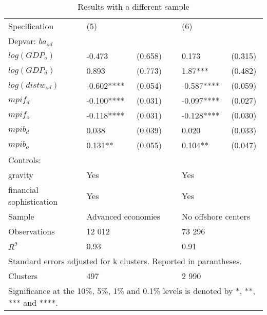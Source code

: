 \documentclass[12pt,a4paper]{article}
\begin{document}
\begin{table}[!h]
\centering
\begin{tabular}{ l l l l l l}
\hline
Specification&(5)&&&(6)& \\
Depvar: $ba_{od}$&&&&&\\
\hline
$log(GDP_{o})$&-0.473&(0.658)&&0.173&(0.315)\\
$log(GDP_{d})$&0.893&(0.773)&&1.87***&(0.482)\\
$log(distw_{od})$&-0.602****&(0.054)&&-0.587****&(0.059)\\
$mpif_{d}$&-0.100****&(0.031)&&-0.097****&(0.027)\\
$mpif_{o}$&-0.118****&(0.031)&&-0.128****&(0.030)\\
$mpib_{d}$&0.038&(0.039)&&0.020&(0.033)\\
$mpib_{o}$&0.131**&(0.055)&&0.104**&(0.047)\\
Controls:&&&&&\\
gravity &Yes&&&Yes& \\ 
financial sophistication &Yes&&&Yes& \\
\hline
Sample &\multicolumn{2}{l}{Advanced economies}&&\multicolumn{2}{l}{No offshore centers} \\
Observations &12 012&&&73 296& \\
\hline
$R^2$&0.93&&&0.91&\\
\hline
\multicolumn{6}{l}{Standard errors adjusted for k clusters. Reported in parantheses. }\\
Clusters &497&&&2 990& \\
\hline
\multicolumn{6}{l}{\footnotesize Significance at the 10\%, 5\%, 1\% and 0.1\% levels is denoted by *, **, *** and ****.}\\
\end{tabular}
\caption{Results with a different sample}
\label{tab:robust2}
\end{table}

\end{document}
